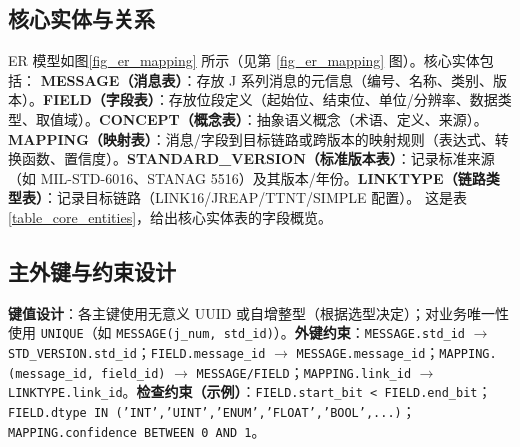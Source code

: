 \subsection{核心实体与关系}
ER 模型如图\ref{fig_er_mapping} 所示（见第 \ref{fig_er_mapping} 图）。核心实体包括：
\textbf{MESSAGE（消息表）}：存放 J 系列消息的元信息（编号、名称、类别、版本）。\textbf{FIELD（字段表）}：存放位段定义（起始位、结束位、单位/分辨率、数据类型、取值域）。\textbf{CONCEPT（概念表）}：抽象语义概念（术语、定义、来源）。\textbf{MAPPING（映射表）}：消息/字段到目标链路或跨版本的映射规则（表达式、转换函数、置信度）。\textbf{STANDARD\_VERSION（标准版本表）}：记录标准来源（如 MIL-STD-6016、STANAG 5516）及其版本/年份。\textbf{LINKTYPE（链路类型表）}：记录目标链路（LINK16/JREAP/TTNT/SIMPLE 配置）。
这是表 \ref{table_core_entities}，给出核心实体表的字段概览。
\begin{table}[!htb]
    \caption{核心实体表字段概览（节选）}
    \label{table_core_entities}
    \centering
\end{table}

\subsection{主外键与约束设计}
\textbf{键值设计}：各主键使用无意义 UUID 或自增整型（根据选型决定）；对业务唯一性使用 \texttt{UNIQUE}（如 \texttt{MESSAGE(j\_num, std\_id)}）。\textbf{外键约束}：\texttt{MESSAGE.std\_id} $\rightarrow$ \texttt{STD\_VERSION.std\_id}；\texttt{FIELD.message\_id} $\rightarrow$ \texttt{MESSAGE.message\_id}；\texttt{MAPPING.(message\_id, field\_id)} $\rightarrow$ \texttt{MESSAGE/FIELD}；\texttt{MAPPING.link\_id} $\rightarrow$ \texttt{LINKTYPE.link\_id}。\textbf{检查约束（示例）}：\texttt{FIELD.start\_bit < FIELD.end\_bit}；\texttt{FIELD.dtype IN ('INT','UINT','ENUM','FLOAT','BOOL',...)}；\texttt{MAPPING.confidence BETWEEN 0 AND 1}。


